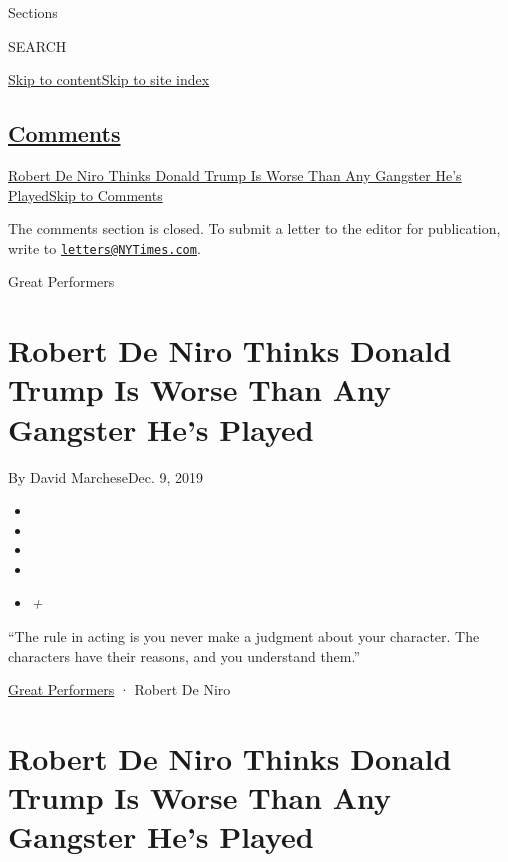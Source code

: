 Sections

SEARCH

\protect\hyperlink{site-content}{Skip to
content}\protect\hyperlink{site-index}{Skip to site index}

\hypertarget{comments}{%
\subsection{\texorpdfstring{\protect\hyperlink{commentsContainer}{Comments}}{Comments}}\label{comments}}

\href{}{Robert De Niro Thinks Donald Trump Is Worse Than Any Gangster
He's Played}\href{}{Skip to Comments}

The comments section is closed. To submit a letter to the editor for
publication, write to
\href{mailto:letters@NYTimes.com}{\nolinkurl{letters@NYTimes.com}}.

Great Performers

\hypertarget{robert-de-niro-thinks-donald-trump-is-worse-than-any-gangster-hes-played}{%
\section{Robert De Niro Thinks Donald Trump Is Worse Than Any Gangster
He's
Played}\label{robert-de-niro-thinks-donald-trump-is-worse-than-any-gangster-hes-played}}

By David MarcheseDec. 9, 2019

\begin{itemize}
\item
\item
\item
\item
\item
  \emph{+}
\end{itemize}

``The rule in acting is you never make a judgment about your character.
The characters have their reasons, and you understand them.''

\href{https://www.nytimes3xbfgragh.onion/interactive/2019/12/09/magazine/best-actors.html}{Great
Performers} · Robert De Niro

\hypertarget{robert-de-niro-thinks-donald-trump-is-worse-than-any-gangster-hes-played-1}{%
\section{Robert De Niro Thinks Donald Trump Is Worse Than Any Gangster
He's
Played}\label{robert-de-niro-thinks-donald-trump-is-worse-than-any-gangster-hes-played-1}}

